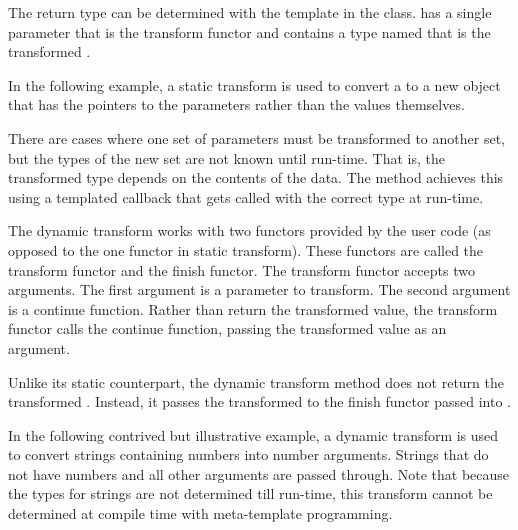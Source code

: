 The return type can be determined with the 
template in the 
class.  has a single parameter that is the
transform functor and contains a type named  that is the
transformed .

In the following example, a static transform is used to convert a
 to a new object that has the pointers to
the parameters rather than the values themselves.




There are cases where one set of parameters must be transformed to another
set, but the types of the new set are not known until run-time. That is,
the transformed type depends on the contents of the data. The
 method achieves this using a templated
callback that gets called with the correct type at run-time.

The dynamic transform works with two functors provided by the user code (as
opposed to the one functor in static transform). These functors are called
the transform functor and the finish functor. The transform functor accepts
two arguments. The first argument is a parameter to transform. The second
argument is a continue function. Rather than return the transformed value,
the transform functor calls the continue function, passing the transformed
value as an argument.

Unlike its static counterpart, the dynamic transform method does not return
the transformed . Instead, it passes the
transformed  to the finish functor passed
into .

In the following contrived but illustrative example, a dynamic transform is
used to convert strings containing numbers into number arguments. Strings
that do not have numbers and all other arguments are passed through. Note
that because the types for strings are not determined till run-time, this
transform cannot be determined at compile time with meta-template
programming.



